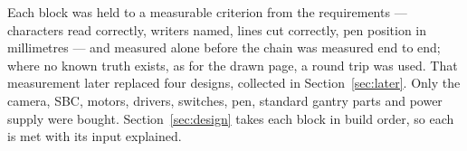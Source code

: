 Each block was held to a measurable criterion from the requirements --- characters read correctly, writers named, lines cut correctly, pen position in millimetres --- and measured alone before the chain was measured end to end; where no known truth exists, as for the drawn page, a round trip was used. That measurement later replaced four designs, collected in Section~\ref{sec:later}. Only the camera, SBC, motors, drivers, switches, pen, standard gantry parts and power supply were bought.  Section~\ref{sec:design} takes each block in build order, so each is met with its input explained.
